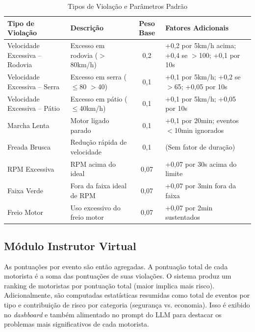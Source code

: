 \documentclass[12pt]{article}
\begin{document}
\begin{table}[h!]
    \centering
    \caption{Tipos de Violação e Parâmetros Padrão}
    \label{tab:violation_types_pt} %
    \tiny %
    \setlength{\tabcolsep}{3pt} %
    \begin{tabular}{|l|p{2.5cm}|c|p{4cm}|} %
        \hline
        \textbf{Tipo de Violação} & \textbf{Descrição} & \textbf{Peso Base} & \textbf{Fatores Adicionais} \\
        \hline
        Velocidade Excessiva – Rodovia & Excesso em rodovia ($>$80km/h) & 0,2 & +0,2 por 5km/h acima; +0,4 se $>$100; +0,1 por 10s \\
        Velocidade Excessiva – Serra & Excesso em serra ($\le$80 $>$40) & 0,1 & +0,1 por 5km/h; +0,2 se $>$65; +0,05 por 10s \\
        Velocidade Excessiva – Pátio & Excesso em pátio ($\le$40km/h) & 0,1 & +0,1 por 5km/h; +0,05 por 10s \\
        Marcha Lenta & Motor ligado parado & 0,1 & +0,1 por 20min; eventos $<$10min ignorados \\
        Freada Brusca & Redução rápida de velocidade & 0,1 & (Sem fator de duração) \\
        RPM Excessiva & RPM acima do ideal & 0,07 & +0,07 por 30s acima do limite \\
        Faixa Verde & Fora da faixa ideal de RPM & 0,07 & +0,07 por 3min fora da faixa \\
        Freio Motor & Uso excessivo do freio motor & 0,07 & +0,07 por 2min sustentados \\
        \hline
    \end{tabular}
\end{table}

\subsection{Módulo Instrutor Virtual}


As pontuações por evento são então agregadas. A pontuação total de cada motorista é a soma das pontuações de suas violações. O sistema produz um ranking de motoristas por pontuação total (maior implica mais risco). Adicionalmente, são computadas estatísticas resumidas como total de eventos por tipo e contribuição de risco por categoria (segurança vs. economia). Isso é exibido no \textit{dashboard} e também alimentado no prompt do LLM para destacar os problemas mais significativos de cada motorista.
\end{document}

